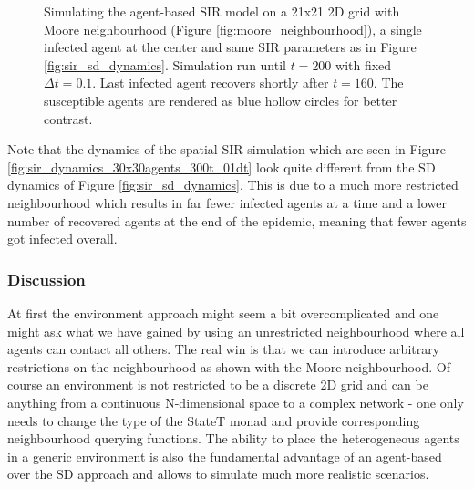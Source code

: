 \begin{figure}
\begin{center}
	\caption{Simulating the agent-based SIR model on a 21x21 2D grid with Moore neighbourhood (Figure \ref{fig:moore_neighbourhood}), a single infected agent at the center and same SIR parameters as in Figure \ref{fig:sir_sd_dynamics}. Simulation run until $t = 200$ with fixed $\Delta t = 0.1$. Last infected agent recovers shortly after $t = 160$. The susceptible agents are rendered as blue hollow circles for better contrast.}
	\label{fig:sir_env}
\end{center}
\end{figure}

Note that the dynamics of the spatial SIR simulation which are seen in Figure \ref{fig:sir_dynamics_30x30agents_300t_01dt} look quite different from the SD dynamics of Figure \ref{fig:sir_sd_dynamics}. This is due to a much more restricted neighbourhood which results in far fewer infected agents at a time and a lower number of recovered agents at the end of the epidemic, meaning that fewer agents got infected overall.

\subsubsection{Discussion}
At first the environment approach might seem a bit overcomplicated and one might ask what we have gained by using an unrestricted neighbourhood where all agents can contact all others. The real win is that we can introduce arbitrary restrictions on the neighbourhood as shown with the Moore neighbourhood. Of course an environment is not restricted to be a discrete 2D grid and can be anything from a continuous N-dimensional space to a complex network - one only needs to change the type of the StateT monad and provide corresponding neighbourhood querying functions. The ability to place the heterogeneous agents in a generic environment is also the fundamental advantage of an agent-based over the SD approach and allows to simulate much more realistic scenarios. 
